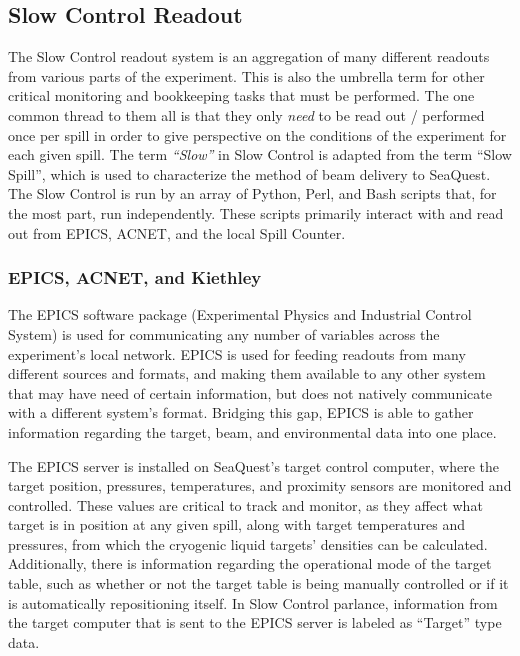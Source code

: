 \subsection{Slow Control Readout}

The Slow Control readout system is an aggregation of many different readouts from various parts of the experiment. This is also the umbrella term for other critical monitoring and bookkeeping tasks that must be performed. The one common thread to them all is that they only \emph{need} to be read out / performed once per spill in order to give perspective on the conditions of the experiment for each given spill. The term \emph{``Slow''} in Slow Control is adapted from the term ``Slow Spill'', which is used to characterize the method of beam delivery to SeaQuest. The Slow Control is run by an array of Python, Perl, and Bash scripts that, for the most part, run independently. These scripts primarily interact with and read out from EPICS, ACNET, and the local Spill Counter.

\subsubsection{EPICS, ACNET, and Kiethley}

The EPICS software package (Experimental Physics and Industrial Control System) is used for communicating any number of variables across the experiment's local network. EPICS is used for feeding readouts from many different sources and formats, and making them available to any other system that may have need of certain information, but does not natively communicate with a different system's format. Bridging this gap, EPICS is able to gather information regarding the target, beam, and environmental data into one place.

The EPICS server is installed on SeaQuest's target control computer, where the target position, pressures, temperatures, and proximity sensors are monitored and controlled. These values are critical to track and monitor, as they affect what target is in position at any given spill, along with target temperatures and pressures, from which the cryogenic liquid targets' densities can be calculated. Additionally, there is information regarding the operational mode of the target table, such as whether or not the target table is being manually controlled or if it is automatically repositioning itself. In Slow Control parlance, information from the target computer that is sent to the EPICS server is labeled as ``Target'' type data.

